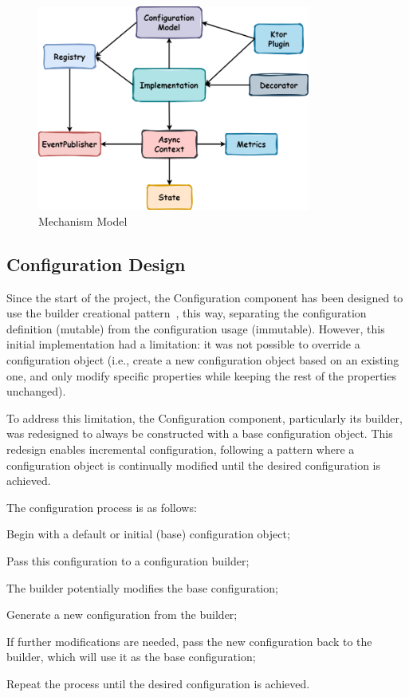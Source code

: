 \begin{figure}[!htb]
    \centering
    \includegraphics[width=0.8\textwidth]{../figures/03_mechanism-model}
    \caption{Mechanism Model}
    \label{fig:mechanism-model}
\end{figure}

\subsection{Configuration Design}\label{subsec:configuration-design}

Since the start of the project, the Configuration component has been designed to use the builder creational pattern~\cite{effective-java, design-patterns}, this way, separating the configuration definition (mutable) from the configuration usage (immutable).
However, this initial implementation had a limitation: it was not possible to override a configuration object (i.e., create a new configuration object based on an existing one, and only modify specific properties while keeping the rest of the properties unchanged).

To address this limitation, the Configuration component, particularly its builder,
was redesigned to always be constructed with a base configuration object.
This redesign enables incremental configuration, following a pattern where a configuration object is continually modified until the desired configuration is achieved.

The configuration process is as follows:

\begin{boldenumerate}
    \item Begin with a default or initial (base) configuration object;
    \item Pass this configuration to a configuration builder;
    \item The builder potentially modifies the base configuration;
    \item Generate a new configuration from the builder;
    \item If further modifications are needed, pass the new configuration back to the builder, which will use it as the base configuration;
    \item Repeat the process until the desired configuration is achieved.
\end{boldenumerate}

